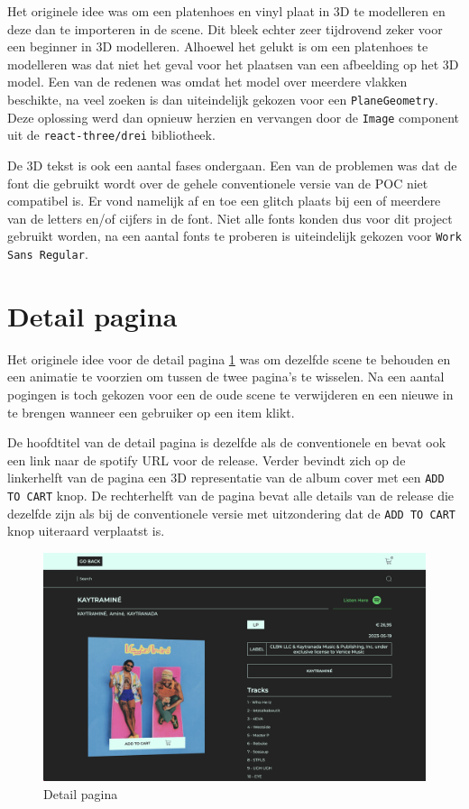 Het originele idee was om een platenhoes en vinyl plaat in 3D te modelleren en deze dan te importeren in de scene. Dit bleek echter zeer tijdrovend zeker voor een beginner in 3D modelleren. Alhoewel het gelukt is om een platenhoes te modelleren was dat niet het geval voor het plaatsen van een afbeelding op het 3D model. Een van de redenen was omdat het model over meerdere vlakken beschikte, na veel zoeken is dan uiteindelijk gekozen voor een \texttt{PlaneGeometry}. Deze oplossing werd dan opnieuw herzien en vervangen door de \texttt{Image} component uit de \texttt{react-three/drei} bibliotheek.

De 3D tekst is ook een aantal fases ondergaan. Een van de problemen was dat de font die gebruikt wordt over de gehele conventionele versie van de POC niet compatibel is. Er vond namelijk af en toe een glitch plaats bij een of meerdere van de letters en/of cijfers in de font. Niet alle fonts konden dus voor dit project gebruikt worden, na een aantal fonts te proberen is uiteindelijk gekozen voor \texttt{Work Sans Regular}.

\section{Detail pagina}

Het originele idee voor de detail pagina \ref{fig:detailPageThree} was om dezelfde scene te behouden en een animatie te voorzien om tussen de twee pagina's te wisselen. Na een aantal pogingen is toch gekozen voor een de oude scene te verwijderen en een nieuwe in te brengen wanneer een gebruiker op een item klikt.

De hoofdtitel van de detail pagina is dezelfde als de conventionele en bevat ook een link naar de spotify URL voor de release. Verder bevindt zich op de linkerhelft van de pagina een 3D representatie van de album cover met een \texttt{ADD TO CART} knop. De rechterhelft van de pagina bevat alle details van de release die dezelfde zijn als bij de conventionele versie met uitzondering dat de \texttt{ADD TO CART} knop uiteraard verplaatst is.

\begin{figure}[h]
	\centering
	\includegraphics[width=1\linewidth]{graphics/detailPageThree}
	\caption[Detail pagina]{Detail pagina}
	\label{fig:detailPageThree}
\end{figure}

